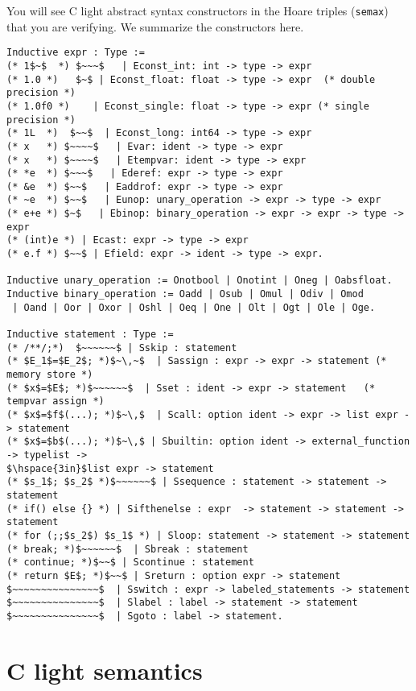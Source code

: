 \documentclass[12pt,fleqn,openany,oneside,showtrims]{memoir}
\begin{document}
You will see C light abstract syntax constructors
in the Hoare triples (\lstinline{semax}) that you are verifying.
We summarize the constructors here.

\begin{lstlisting}
Inductive expr : Type :=
(* 1$~$  *) $~~~$   | Econst_int: int -> type -> expr
(* 1.0 *)   $~$ | Econst_float: float -> type -> expr  (* double precision *)
(* 1.0f0 *)    | Econst_single: float -> type -> expr (* single precision *)
(* 1L  *)  $~~$  | Econst_long: int64 -> type -> expr
(* x   *) $~~~~$   | Evar: ident -> type -> expr
(* x   *) $~~~~$   | Etempvar: ident -> type -> expr
(* *e  *) $~~~$   | Ederef: expr -> type -> expr
(* &e  *) $~~$   | Eaddrof: expr -> type -> expr
(* ~e  *) $~~$   | Eunop: unary_operation -> expr -> type -> expr
(* e+e *) $~$   | Ebinop: binary_operation -> expr -> expr -> type -> expr
(* (int)e *) | Ecast: expr -> type -> expr
(* e.f *) $~~$ | Efield: expr -> ident -> type -> expr.

Inductive unary_operation := Onotbool | Onotint | Oneg | Oabsfloat.
Inductive binary_operation := Oadd | Osub | Omul | Odiv | Omod
 | Oand | Oor | Oxor | Oshl | Oeq | One | Olt | Ogt | Ole | Oge.

Inductive statement : Type :=
(* /**/;*)  $~~~~~~$ | Sskip : statement
(* $E_1$=$E_2$; *)$~\,~$  | Sassign : expr -> expr -> statement (* memory store *)
(* $x$=$E$; *)$~~~~~~$  | Sset : ident -> expr -> statement   (* tempvar assign *)
(* $x$=$f$(...); *)$~\,$  | Scall: option ident -> expr -> list expr -> statement
(* $x$=$b$(...); *)$~\,$ | Sbuiltin: option ident -> external_function -> typelist ->
$\hspace{3in}$list expr -> statement
(* $s_1$; $s_2$ *)$~~~~~~$ | Ssequence : statement -> statement -> statement
(* if() else {} *) | Sifthenelse : expr  -> statement -> statement -> statement
(* for (;;$s_2$) $s_1$ *) | Sloop: statement -> statement -> statement
(* break; *)$~~~~~~$  | Sbreak : statement
(* continue; *)$~~$ | Scontinue : statement
(* return $E$; *)$~~$ | Sreturn : option expr -> statement
$~~~~~~~~~~~~~~~$  | Sswitch : expr -> labeled_statements -> statement
$~~~~~~~~~~~~~~~$  | Slabel : label -> statement -> statement
$~~~~~~~~~~~~~~~$  | Sgoto : label -> statement.
\end{lstlisting}

\chapter{C light semantics}
\end{document}
